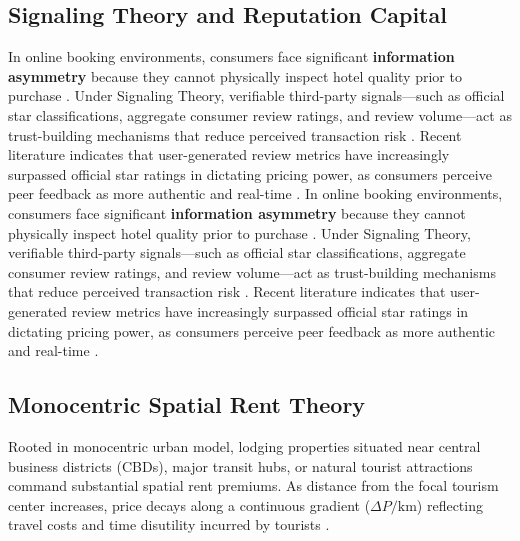 \documentclass[11pt,a4paper]{article}
\begin{document}
\subsection{Signaling Theory and Reputation Capital}
In online booking environments, consumers face significant \textbf{information asymmetry} because they cannot physically inspect hotel quality prior to purchase \citep{spence1973}. Under Signaling Theory, verifiable third-party signals---such as official star classifications, aggregate consumer review ratings, and review volume---act as trust-building mechanisms that reduce perceived transaction risk \citep{viglia2016}. Recent literature indicates that user-generated review metrics have increasingly surpassed official star ratings in dictating pricing power, as consumers perceive peer feedback as more authentic and real-time \citep{moro2023}.
In online booking environments, consumers face significant \textbf{information asymmetry} because they cannot physically inspect hotel quality prior to purchase \citep{spence1973}. Under Signaling Theory, verifiable third-party signals---such as official star classifications, aggregate consumer review ratings, and review volume---act as trust-building mechanisms that reduce perceived transaction risk \citep{viglia2016}. Recent literature indicates that user-generated review metrics have increasingly surpassed official star ratings in dictating pricing power, as consumers perceive peer feedback as more authentic and real-time \citep{moro2018}.

\subsection{Monocentric Spatial Rent Theory}
Rooted in \citet{alonso1964} monocentric urban model, lodging properties situated near central business districts (CBDs), major transit hubs, or natural tourist attractions command substantial spatial rent premiums. As distance from the focal tourism center increases, price decays along a continuous gradient ($\Delta P / \text{km}$) reflecting travel costs and time disutility incurred by tourists \citep{espinet2003, thrane2007}.
\end{document}
